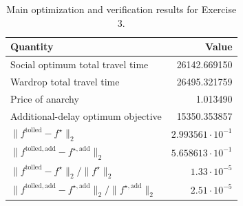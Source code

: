 \documentclass[11pt,a4paper]{article}
\begin{document}
\begin{table}[h]
\centering
\begin{tabular}{l|r}
\hline
Quantity & Value\\
\hline
Social optimum total travel time & 26142.669150\\
Wardrop total travel time & 26495.321759\\
Price of anarchy & 1.013490\\
Additional-delay optimum objective & 15350.353857\\
\(\|f^{\mathrm{tolled}}-f^\star\|_2\) & \(2.993561\cdot 10^{-1}\)\\
\(\|f^{\mathrm{tolled,add}}-f^{\star,\mathrm{add}}\|_2\) &
\(5.658613\cdot 10^{-1}\)\\
\(\|f^{\mathrm{tolled}}-f^\star\|_2 / \|f^\star\|_2\) & \(1.33\cdot 10^{-5}\) \\
\(\|f^{\mathrm{tolled,add}}-f^{\star,\mathrm{add}}\|_2 / \|f^{\star,\mathrm{add}}\|_2\) & \(2.51\cdot 10^{-5}\) \\
\hline
\end{tabular}
\caption{Main optimization and verification results for Exercise 3.}
\label{tab:exercise3-summary}
\end{table}
\end{document}
